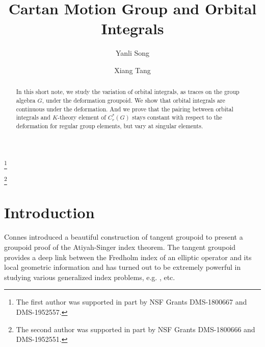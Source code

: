 \documentclass{amsproc}
\theoremstyle{definition}
\theoremstyle{remark}
\numberwithin{equation}{section}
\begin{document}
\title{Cartan Motion Group and Orbital Integrals}

\author{Yanli Song}
\address{Department of Mathematics and Statistics, Washington University, St. Louis, Missouri 63130}
\thanks{The first author was supported in part by NSF Grants DMS-1800667 and DMS-1952557.}

\author{Xiang Tang}
\address{Department of Mathematics and Statistics, Washington University, St. Louis, Missouri, 63130}
\thanks{The second author was supported in part by NSF Grants DMS-1800666 and DMS-1952551.}

\subjclass{}



\begin{abstract} In this short note, we study the variation of orbital integrals, as traces on the group algebra $G$, under the deformation groupoid. We show that orbital integrals are continuous under the deformation. And we prove that the pairing between orbital integrals and $K$-theory element of $C^*_r(G)$ stays constant with respect to the deformation for regular group elements, but vary at singular elements.    
\end{abstract}

\maketitle

\section{Introduction}

Connes introduced a beautiful construction of tangent groupoid \cite{connes} to present a groupoid proof of the Atiyah-Singer index theorem. The tangent groupoid provides a deep link between the Fredholm index of an elliptic operator and its local geometric information and has turned out to be extremely powerful in studying various generalized index problems, e.g. \cite{Connes-Skandalis, mont, DLN, vanerp1, vanerp2, VY1, VY2, AMY1, AMY2, PPT}, etc. 
\end{document}

